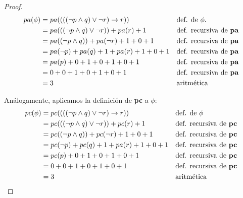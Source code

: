 \documentclass[letterpaper,11pt]{article}
\begin{document}
\begin{enumerate}
\begin{itemize}
\begin{proof}
                \begin{align*}
                    pa(\phi) 
                    &= pa(((( \neg p \land q) \lor \neg r) \rightarrow r))
                    && \text{def. de $\phi$.} \\
                    &= pa(((\neg p \land q) \lor \neg r)) + pa(r) + 1
                    && \text{def. recursiva de \textbf{pa}} \\
                    &= pa((\neg p \land q)) + pa(\neg r) + 1 + 0 + 1
                    && \text{def. recursiva de \textbf{pa}} \\
                    &= pa(\neg p) + pa(q) + 1 + pa(r) + 1 + 0 + 1
                    && \text{def. recursiva de \textbf{pa}} \\
                    &= pa(p) + 0 + 1 + 0 + 1 + 0 + 1
                    && \text{def. recursiva de \textbf{pa}} \\
                    &= 0 + 0 + 1 + 0 + 1 + 0 + 1
                    && \text{def. recursiva de \textbf{pa}} \\
                    &= 3
                    && \text{aritmética}
                \end{align*}

                Análogamente, aplicamos la definición de \textbf{pc} a $\phi$:
                \begin{align*}
                    pc(\phi) 
                    &= pc(((( \neg p \land q) \lor \neg r) \rightarrow r))
                    && \text{def. de $\phi$} \\
                    &= pc(((\neg p \land q) \lor \neg r)) + pc(r) + 1
                    && \text{def. recursiva de \textbf{pc}} \\
                    &= pc((\neg p \land q)) + pc(\neg r) + 1 + 0 + 1
                    && \text{def. recursiva de \textbf{pc}} \\
                    &= pc(\neg p) + pc(q) + 1 + pa(r) + 1 + 0 + 1
                    && \text{def. recursiva de \textbf{pc}} \\
                    &= pc(p) + 0 + 1 + 0 + 1 + 0 + 1
                    && \text{def. recursiva de \textbf{pc}} \\
                    &= 0 + 0 + 1 + 0 + 1 + 0 + 1
                    && \text{def. recursiva de \textbf{pc}} \\
                    &= 3
                    && \text{aritmética}
                \end{align*}


\end{proof}
\end{itemize}
\end{enumerate}
\end{document}

